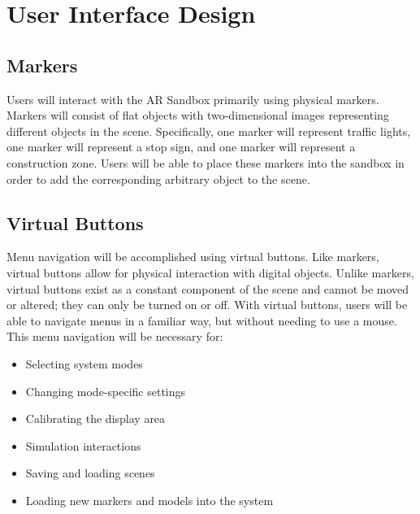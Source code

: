 \documentclass[letterpaper, 10pt, onecolumn, draftclsnofoot]{IEEEtran}
\begin{document}
\section{User Interface Design}
    \subsection{Markers}
        Users will interact with the AR Sandbox primarily using physical markers. Markers will consist of flat objects with two-dimensional images representing different objects in the scene. Specifically, one marker will represent traffic lights, one marker will represent a stop sign, and one marker will represent a construction zone. Users will be able to place these markers into the sandbox in order to add the corresponding arbitrary object to the scene.
        
    \subsection{Virtual Buttons}
        Menu navigation will be accomplished using virtual buttons. Like markers, virtual buttons allow for physical interaction with digital objects. Unlike markers, virtual buttons exist as a constant component of the scene and cannot be moved or altered; they can only be turned on or off. With virtual buttons, users will be able to navigate menus in a familiar way, but without needing to use a mouse. This menu navigation will be necessary for:
        \begin{itemize}
            \item Selecting system modes
            \item Changing mode-specific settings
            \item Calibrating the display area
            \item Simulation interactions
            \item Saving and loading scenes
            \item Loading new markers and models into the system 
        \end{itemize}

\newpage
\appendices
\end{document}
